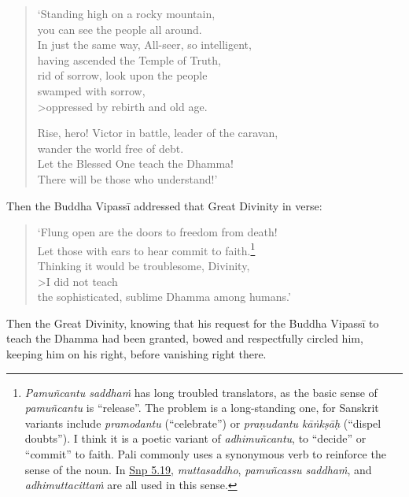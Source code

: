 \documentclass[12pt,openany]{book}%
\begin{document}
\begin{verse}%
‘Standing high on a rocky mountain, \\
you can see the people all around. \\
In just the same way, All-seer, so intelligent, \\
having ascended the Temple of Truth, \\
rid of sorrow, look upon the people \\
swamped with sorrow, \\>oppressed by rebirth and old age. 

Rise, hero! Victor in battle, leader of the caravan, \\
wander the world free of debt. \\
Let the Blessed One teach the Dhamma! \\
There will be those who understand!’ 

%
\end{verse}

Then the Buddha \textsanskrit{Vipassī} addressed that Great Divinity in verse: 

\begin{verse}%
‘Flung open are the doors to freedom from death! \\
Let those with ears to hear commit to faith.\footnote{\textit{\textsanskrit{Pamuñcantu} \textsanskrit{saddhaṁ}} has long troubled translators, as the basic sense of \textit{\textsanskrit{pamuñcantu}} is “release”. The problem is a long-standing one, for Sanskrit variants include \textit{pramodantu} (“celebrate”) or \textit{\textsanskrit{praṇudantu} \textsanskrit{kāṅkṣāḥ}} (“dispel doubts”). I think it is a poetic variant of \textit{\textsanskrit{adhimuñcantu}}, to “decide” or “commit” to faith. Pali commonly uses a synonymous verb to reinforce the sense of the noun. In \href{https://suttacentral.net/snp5.19/en/sujato}{Snp 5.19}, \textit{muttasaddho}, \textit{\textsanskrit{pamuñcassu} \textsanskrit{saddhaṁ}}, and \textit{\textsanskrit{adhimuttacittaṁ}} are all used in this sense. } \\
Thinking it would be troublesome, Divinity, \\>I did not teach \\
the sophisticated, sublime Dhamma among humans.’ 

%
\end{verse}

Then the Great Divinity, knowing that his request for the Buddha \textsanskrit{Vipassī} to teach the Dhamma had been granted, bowed and respectfully circled him, keeping him on his right, before vanishing right there. 
\end{document}
